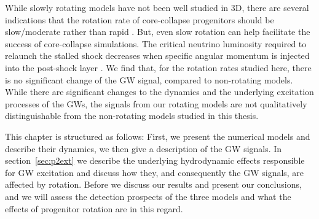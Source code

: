While slowly rotating models have not been well studied in 3D, there are several
indications that the rotation rate of core-collapse progenitors should be slow/moderate 
rather than rapid \citep{heger_05,beck_12,mosser_12,popov_12,noutsos_13,cantiello_14,deheuvels_14}. 
But, even slow rotation can help facilitate the success of core-collapse
simulations. The critical neutrino luminosity required to relaunch the stalled shock decreases when 
specific angular momentum is injected into the post-shock layer \citep{iwakami_14,nakamura_14}.
We find that, for the rotation rates studied here, there is no significant change of
the GW signal, compared to non-rotating models. While there are significant changes to the dynamics
and the underlying excitation processes of the GWs, the signals from our rotating models are not qualitatively
distinguishable from the non-rotating models studied in this thesis. 

This chapter is structured as follows: First, we present the numerical models and describe their dynamics,
we then give a description of the GW signals. In section~\ref{sec:p2ext} we describe the underlying hydrodynamic
effects responsible for GW excitation and discuss how they, and consequently the GW signals, are affected by rotation. 
Before we discuss our results and present our conclusions, and we will assess the detection prospects of the three
models and what the effects of progenitor rotation are in this regard.  

